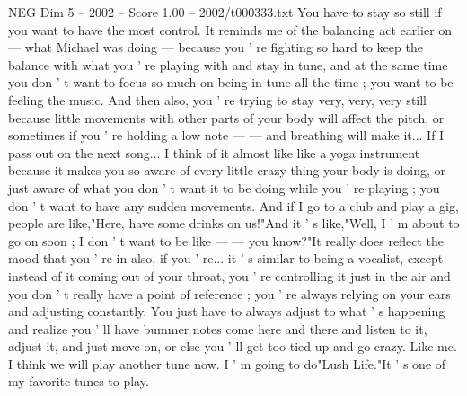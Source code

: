 \begin{textsample}{NEG Dim 5 – 2002 – Score 1.00 – 2002/t000333.txt}
You have to stay so still if you want to have the most control.
It reminds me of the balancing act earlier on — what Michael was doing — because you ' re fighting so hard to keep the balance with what you ' re playing with and stay in tune, and at the same time you don ' t want to focus so much on being in tune all the time ; you want to be feeling the music.
And then also, you ' re trying to stay very, very, very still because little movements with other parts of your body will affect the pitch, or sometimes if you ' re holding a low note — — and breathing will make it...
If I pass out on the next song...
I think of it almost like like a yoga instrument because it makes you so aware of every little crazy thing your body is doing, or just aware of what you don ' t want it to be doing while you ' re playing ; you don ' t want to have any sudden movements.
And if I go to a club and play a gig, people are like,"Here, have some drinks on us!"And it ' s like,"Well, I ' m about to go on soon ; I don ' t want to be like — — you know?"It really does reflect the mood that you ' re in also, if you ' re... it ' s similar to being a vocalist, except instead of it coming out of your throat, you ' re controlling it just in the air and you don ' t really have a point of reference ; you ' re always relying on your ears and adjusting constantly.
You just have to always adjust to what ' s happening and realize you ' ll have bummer notes come here and there and listen to it, adjust it, and just move on, or else you ' ll get too tied up and go crazy.
Like me.
I think we will play another tune now.
I ' m going to do"Lush Life."It ' s one of my favorite tunes to play.

\end{textsample}
